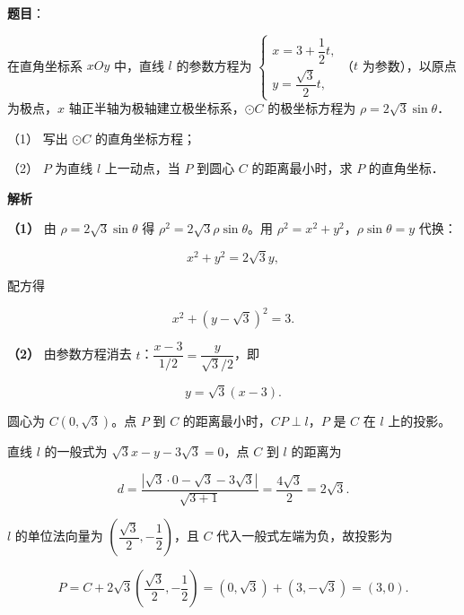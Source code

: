 \begin{answer}

\textbf{题目}：

在直角坐标系 $xOy$ 中，直线 $l$ 的参数方程为 $\begin{cases}x=3+\dfrac{1}{2}t,\\[4pt] y=\dfrac{\sqrt{3}}{2}t,\end{cases}$（$t$ 为参数），以原点为极点，$x$ 轴正半轴为极轴建立极坐标系，$\odot C$ 的极坐标方程为 $\rho=2\sqrt{3}\sin\theta$．

（1） 写出 $\odot C$ 的直角坐标方程；

（2） $P$ 为直线 $l$ 上一动点，当 $P$ 到圆心 $C$ 的距离最小时，求 $P$ 的直角坐标．

\textbf{解析}

\textbf{（1）} 由 $\rho=2\sqrt{3}\sin\theta$ 得 $\rho^{2}=2\sqrt{3}\rho\sin\theta$。用 $\rho^{2}=x^{2}+y^{2}$，$\rho\sin\theta=y$ 代换：

\nopagebreak[4]
\[
x^{2}+y^{2}=2\sqrt{3}y,
\]

配方得

\nopagebreak[4]
\[
x^{2}+(y-\sqrt{3})^{2}=3.
\]

\textbf{（2）} 由参数方程消去 $t$：$\dfrac{x-3}{1/2}=\dfrac{y}{\sqrt{3}/2}$，即

\nopagebreak[4]
\[
y=\sqrt{3}(x-3).
\]

圆心为 $C(0,\sqrt{3})$。点 $P$ 到 $C$ 的距离最小时，$CP\perp l$，$P$ 是 $C$ 在 $l$ 上的投影。

直线 $l$ 的一般式为 $\sqrt{3}x-y-3\sqrt{3}=0$，点 $C$ 到 $l$ 的距离为

\nopagebreak[4]
\[
d=\frac{|\sqrt{3}\cdot 0-\sqrt{3}-3\sqrt{3}|}{\sqrt{3+1}}=\frac{4\sqrt{3}}{2}=2\sqrt{3}.
\]

$l$ 的单位法向量为 $\left(\dfrac{\sqrt{3}}{2},-\dfrac{1}{2}\right)$，且 $C$ 代入一般式左端为负，故投影为

\nopagebreak[4]
\[
P=C+2\sqrt{3}\left(\frac{\sqrt{3}}{2},-\frac{1}{2}\right)=(0,\sqrt{3})+(3,-\sqrt{3})=(3,0).
\]



\end{answer}
